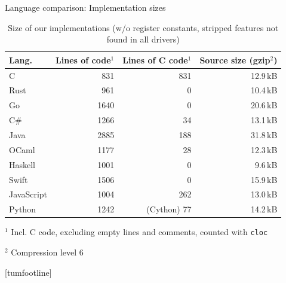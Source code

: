 \documentclass[NET,english,aspectratio=169,notitleframe]{tumbeamer}
\begin{document}
\begin{frame}{Language comparison: Implementation sizes}
\begin{table}[t]
 \setlength{\tabcolsep}{2mm}
	\centering
	\footnotesize
	\begin{tabular}{lrrr}
		\\
		\textbf{Lang.} & \textbf{Lines of code}$^1$ & \textbf{Lines of C code}$^1$  & \textbf{Source size (gzip$^2$)} \\
		\toprule
		C & 831 & 831 & 12.9\,kB  \\
		Rust & 961 & 0 & 10.4\,kB\\
		Go & 1640 & 0 & 20.6\,kB \\
		C\# & 1266 & 34 & 13.1\,kB\\
		Java & 2885 & 188 & 31.8\,kB \\
		OCaml & 1177 & 28 &  12.3\,kB\\
		Haskell & 1001 & 0 &  9.6\,kB\\
		Swift & 1506 & 0 & 15.9\,kB \\
		JavaScript & 1004 & 262 &13.0\,kB \\
		Python & 1242 & (Cython) 77 &14.2\,kB \\
		\bottomrule
	\end{tabular}
	\begin{tablenotes}
	\item $^1$ Incl. C code, excluding empty lines and comments, counted with \texttt{cloc}
	\item $^2$ Compression level 6
	\end{tablenotes}
	\caption{Size of our implementations (w/o register constants, stripped features not found in all drivers)}
	\label{tbl:lang-lines}
	\vspace{-3em}
\end{table}
\end{frame}
[tumfootline]
\end{document}
